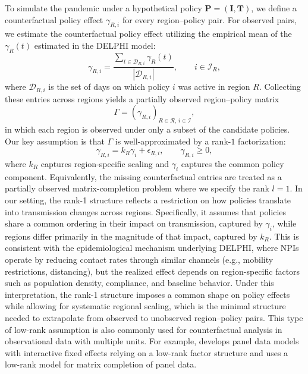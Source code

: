 \documentclass[msom,blindrev]{informs3} %
\begin{document}
{To simulate the pandemic under a hypothetical policy $\bm{P}=(\bm{I},\bm{T})$, we define a counterfactual policy effect $\gamma_{R,i}$ for every region--policy pair. For observed pairs, we estimate the counterfactual policy effect utilizing the empirical mean of the $\gamma_R(t)$ estimated in the DELPHI model:
\begin{equation}
    \gamma_{R,i} = \frac{\sum_{t \in \mathcal{D}_{R,i}} \gamma_R(t)}{|\mathcal{D}_{R,i}|}, \qquad i \in \mathcal{I}_R,
    \label{eq:obsgamma}
\end{equation}
where $\mathcal{D}_{R,i}$ is the set of days on which policy $i$ was active in region $R$. Collecting these entries across regions yields a partially observed region--policy matrix
\[
    \Gamma = (\gamma_{R,i})_{R \in \mathcal{R},\, i \in \mathcal{I}},
\]
in which each region is observed under only a subset of the candidate policies. Our key assumption is that $\Gamma$ is well-approximated by a rank-$1$ factorization:
\begin{equation}
    \gamma_{R,i} = k_R \gamma_i + \epsilon_{R,i}, \qquad \gamma_{R,i} \ge 0,
    \label{eq:uobsgamma}
\end{equation}
where $k_R$ captures region-specific scaling and $\gamma_i$ captures the common policy component. Equivalently, the missing counterfactual entries are treated as a partially observed matrix-completion problem where we specify the rank $l=1$. In our setting, the rank-1 structure reflects a restriction on how policies translate into transmission changes across regions. Specifically, it assumes that policies share a common ordering in their impact on transmission, captured by $\gamma_i$, while regions differ primarily in the magnitude of that impact, captured by $k_R$. This is consistent with the epidemiological mechanism underlying DELPHI, where NPIs operate by reducing contact rates through similar channels (e.g., mobility restrictions, distancing), but the realized effect depends on region-specific factors such as population density, compliance, and baseline behavior. Under this interpretation, the rank-1 structure imposes a common shape on policy effects while allowing for systematic regional scaling, which is the minimal structure needed to extrapolate from observed to unobserved region–policy pairs. This type of low-rank assumption is also commonly used for counterfactual analysis in observational data with multiple units. For example,  develops panel data models with interactive fixed effects relying on a low-rank factor structure and  uses a low-rank model for matrix completion of panel data.

}
\end{document}
